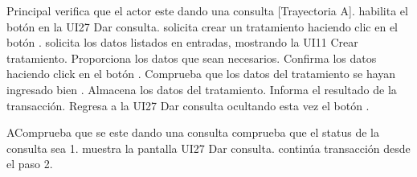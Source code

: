 \begin{UCtrayectoria}{Principal}
  \UCpaso verifica que el actor este dando una consulta [Trayectoria A].
  \UCpaso habilita el botón  en la UI27 Dar consulta.
  \UCpaso[\UCactor] solicita crear un tratamiento haciendo clic en el botón .
  \UCpaso solicita los datos listados en entradas, mostrando la UI11 Crear tratamiento.
  \UCpaso [\UCactor] Proporciona los datos que sean necesarios.
  \UCpaso [\UCactor] Confirma los datos haciendo click en el botón .
  \UCpaso Comprueba que los datos del tratamiento se hayan ingresado bien .
  \UCpaso Almacena los datos del tratamiento.
  \UCpaso Informa el resultado de la transacción.
   \UCpaso Regresa a la UI27 Dar consulta ocultando esta vez el botón  .
   \end{UCtrayectoria}

\begin{UCtrayectoriaA}{A}{Comprueba que se este dando una consulta}
  \UCpaso comprueba que el status de la consulta sea 1.
  \UCpaso muestra la pantalla UI27 Dar consulta.
  \UCpaso continúa transacción desde el paso 2.
\end{UCtrayectoriaA}
